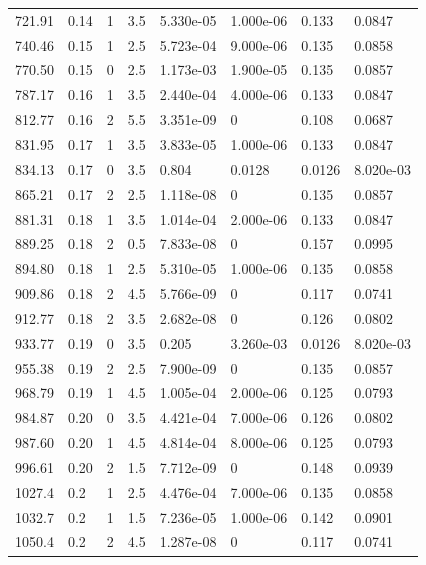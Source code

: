 \documentclass[preview]{standalone}
\begin{document}
{{{\begin{tabular}{L{1.2cm}C{1.2cm} C{0.3cm}C{0.5cm} C{1.4cm}C{1.4cm} C{1.4cm}C{1.4cm}}
  721.91  &  0.14  & 1     & 3.5 &  5.330e-05  & 1.000e-06  & 0.133 &  0.0847   \\ 
  740.46  &  0.15  & 1     & 2.5 &  5.723e-04  & 9.000e-06  & 0.135 &  0.0858   \\ 
  770.50  &  0.15  & 0     & 2.5 &  1.173e-03  & 1.900e-05  & 0.135 &  0.0857   \\ 
  787.17  &  0.16  & 1     & 3.5 &  2.440e-04  & 4.000e-06  & 0.133 &  0.0847   \\ 
  812.77  &  0.16  & 2     & 5.5 &  3.351e-09  & 0  & 0.108 &  0.0687   \\ 
  831.95  &  0.17  & 1     & 3.5 &  3.833e-05  & 1.000e-06  & 0.133 &  0.0847   \\ 
  834.13  &  0.17  & 0     & 3.5 &  0.804  & 0.0128  & 0.0126 &  8.020e-03   \\ 
  865.21  &  0.17  & 2     & 2.5 &  1.118e-08  & 0  & 0.135 &  0.0857   \\ 
  881.31  &  0.18  & 1     & 3.5 &  1.014e-04  & 2.000e-06  & 0.133 &  0.0847   \\ 
  889.25  &  0.18  & 2     & 0.5 &  7.833e-08  & 0  & 0.157 &  0.0995   \\ 
  894.80  &  0.18  & 1     & 2.5 &  5.310e-05  & 1.000e-06  & 0.135 &  0.0858   \\ 
  909.86  &  0.18  & 2     & 4.5 &  5.766e-09  & 0  & 0.117 &  0.0741   \\ 
  912.77  &  0.18  & 2     & 3.5 &  2.682e-08  & 0  & 0.126 &  0.0802   \\ 
  933.77  &  0.19  & 0     & 3.5 &  0.205  & 3.260e-03  & 0.0126 &  8.020e-03   \\ 
  955.38  &  0.19  & 2     & 2.5 &  7.900e-09  & 0  & 0.135 &  0.0857   \\ 
  968.79  &  0.19  & 1     & 4.5 &  1.005e-04  & 2.000e-06  & 0.125 &  0.0793   \\ 
  984.87  &  0.20  & 0     & 3.5 &  4.421e-04  & 7.000e-06  & 0.126 &  0.0802   \\ 
  987.60  &  0.20  & 1     & 4.5 &  4.814e-04  & 8.000e-06  & 0.125 &  0.0793   \\ 
  996.61  &  0.20  & 2     & 1.5 &  7.712e-09  & 0  & 0.148 &  0.0939   \\ 
  1027.4  &   0.2  & 1     & 2.5 &  4.476e-04  & 7.000e-06  & 0.135 &  0.0858   \\ 
  1032.7  &   0.2  & 1     & 1.5 &  7.236e-05  & 1.000e-06  & 0.142 &  0.0901   \\ 
  1050.4  &   0.2  & 2     & 4.5 &  1.287e-08  & 0  & 0.117 &  0.0741   \\ 

\end{tabular}}}}
\end{document}
